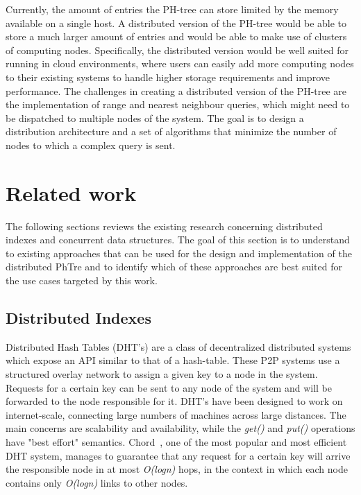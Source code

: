 \documentclass[11pt,a4paper]{globis-book}
\begin{document}
Currently, the amount of entries the PH-tree can store limited by the memory available on a single host. A distributed version of the PH-tree would be able to store a much larger amount of entries and would be able to make use of clusters of computing nodes. Specifically, the distributed version would be well suited for running in cloud environments, where users can easily add more computing nodes to their existing systems to handle higher storage requirements and improve performance. The challenges in creating a distributed version of the PH-tree are the implementation of range and nearest neighbour queries, which might need to be dispatched to multiple nodes of the system. The goal is to design a distribution architecture and a set of algorithms that minimize the number of nodes to which a complex query is sent.

\section{Related work}
\label{sec:background-rw}

The following sections reviews the existing research concerning distributed indexes and concurrent data structures. The goal of this section is to understand to existing approaches that can be used for the design and implementation of the distributed PhTre and to identify which of these approaches are best suited for the use cases targeted by this work.
\subsection{Distributed Indexes}

Distributed Hash Tables (DHT's) are a class of decentralized distributed systems which expose an API similar to that of a hash-table. These P2P systems use a structured overlay network to assign a given key to a node in the system. Requests for a certain key can be sent to any node of the system and will be forwarded to the node responsible for it. DHT's have been designed to work on internet-scale, connecting large numbers of machines across large distances. The main concerns are scalability and availability, while the \textit{get()} and \textit{put()} operations have "best effort" semantics. Chord~\cite{Stoica2001chord}, one of the most popular and most efficient DHT system, manages to guarantee that any request for a certain key will arrive the responsible node in at most \textit{O(logn)} hops, in the context in which each node contains only \textit{O(logn)} links to other nodes. 
\end{document}
